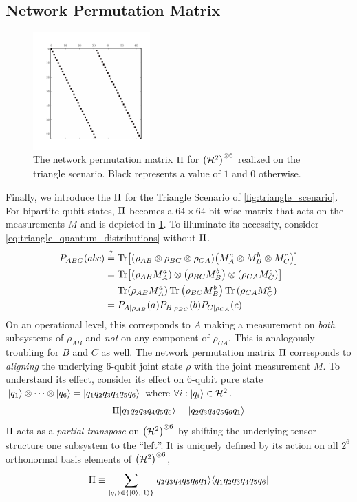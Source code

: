 \documentclass[aps, 10pt, english, twoside, pra, nofootinbib, longbibliography]{revtex4-1}
\begin{document}
    \subsection{Network Permutation Matrix}
    \begin{figure}
        \centering
        \includegraphics[trim={1cm 1.2cm 1.0cm 1cm},clip,width=0.4\textwidth]{../../figures/perm_mtrx.pdf}
        \caption{The network permutation matrix $\Pi$ for $\br{\Hilb^2}^{\otimes 6}$ realized on the triangle scenario. Black represents a value of $1$ and $0$ otherwise.}
        \label{fig:perm_mtrx}
    \end{figure}
    Finally, we introduce the  $\Pi$ for the Triangle Scenario of \cref{fig:triangle_scenario}. For bipartite qubit states, $\Pi$ becomes a $64\times64$ bit-wise matrix that acts on the measurements $M$ and is depicted in \cref{fig:perm_mtrx}. To illuminate its necessity, consider \cref{eq:triangle_quantum_distributions} without $\Pi$.
    \begin{align*}
    \prob[ABC]\br{abc} &\stackrel{?}{=} \Tr\bs{\br{\rho_{AB}\otimes\rho_{BC}\otimes\rho_{CA}} \br{M^a_{A}\otimes M^b_{B} \otimes M^c_{C}}}\\
    &= \Tr\bs{\br{\rho_{AB}M^a_{A}}\otimes\br{\rho_{BC}M^b_{B}}\otimes\br{\rho_{CA}M^c_{C}}}\\
    &= \Tr\br{\rho_{AB}M^a_{A}}\Tr{\br{\rho_{BC}M^b_{B}}}\Tr{\br{\rho_{CA}M^c_{C}}}\\
    &= \prob[A\mid \rho_{AB}]\br{a}\prob[B\mid \rho_{BC}]\br{b}\prob[C\mid \rho_{CA}]\br{c}
    \end{align*}
    On an operational level, this corresponds to $A$ making a measurement on \textit{both} subsystems of $\rho_{AB}$ and \textit{not} on any component of $\rho_{CA}$. This is analogously troubling for $B$ and $C$ as well. The network permutation matrix $\Pi$ corresponds to \textit{aligning} the underlying $6$-qubit joint state $\rho$ with the joint measurement $M$. To understand its effect, consider its effect on $6$-qubit pure state $\ket{q_1} \otimes \cdots \otimes \ket{q_6} = \ket{q_1q_2q_3q_4q_5q_6}$ where $\forall i : \ket{q_i} \in \Hilb^2$.
    \[ \netperm\ket{q_1q_2q_3q_4q_5q_6} = \ket{q_2q_3q_4q_5q_6q_1} \]
    $\Pi$ acts as a \textit{partial transpose} on $\br{\Hilb^2}^{\otimes 6}$ by shifting the underlying tensor structure one subsystem to the ``left''. It is uniquely defined by its action on all $2^6$ orthonormal basis elements of $\br{\Hilb^2}^{\otimes 6}$,
    \[ \netperm \defined \sum_{\ket{q_i} \in \bc{\ket{0}, \ket{1}}}\ket{q_2q_3q_4q_5q_6q_1}\bra{q_1q_2q_3q_4q_5q_6} \]
\end{document}

